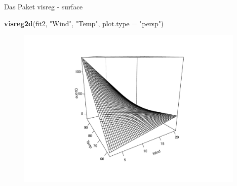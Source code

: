 \documentclass[ignorenonframetext,]{beamer}
\newenvironment{Shaded}{}{}
\newcommand{\KeywordTok}[1]{\textcolor[rgb]{0.00,0.44,0.13}{\textbf{{#1}}}}
\newcommand{\DataTypeTok}[1]{\textcolor[rgb]{0.56,0.13,0.00}{{#1}}}
\newcommand{\StringTok}[1]{\textcolor[rgb]{0.25,0.44,0.63}{{#1}}}
\newcommand{\NormalTok}[1]{{#1}}
\begin{document}
\begin{frame}[fragile]{Das Paket visreg - surface}

\begin{Shaded}
\begin{Highlighting}[]
\KeywordTok{visreg2d}\NormalTok{(fit2, }\StringTok{"Wind"}\NormalTok{, }\StringTok{"Temp"}\NormalTok{, }\DataTypeTok{plot.type =} \StringTok{"persp"}\NormalTok{)}
\end{Highlighting}
\end{Shaded}

\begin{figure}[htbp]
\centering
\includegraphics{RSocialScience2_files/figure-beamer/unnamed-chunk-89-1.pdf}
\caption{}
\end{figure}

\end{frame}
\end{document}
